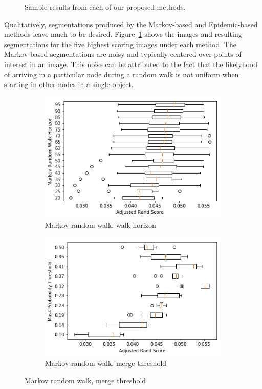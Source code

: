 \documentclass[twocolumn]{article}
\newcommand{\figref}[1]{Figure~\ref{fig:#1}}
\newcommand{\figlab}[1]{\label{fig:#1}}
\begin{document}
\begin{figure}[t!]
\caption{Sample results from each of our proposed methods.}
\figlab{sample_results}
\end{figure}

Qualitatively, segmentations produced by the Markov-based and Epidemic-based
methods leave much to be desired. \figref{sample_results} shows the images and
resulting segmentations for the five highest scoring images under each method.
The Markov-based segmentations are noisy and typically centered over points of
interest in an image. This noise can be attributed to the fact that the
likelyhood of arriving in a particular node during a random walk is not uniform
when starting in other nodes in a single object. 

\begin{figure}[t!]
  \centering

  \begin{subfigure}{0.49\linewidth}
    \includegraphics[width=\linewidth]{figs/markov_horizon.png}
    \caption{Markov random walk, walk horizon}
  \end{subfigure}
  \begin{subfigure}{0.49\linewidth}
    \includegraphics[width=\linewidth]{figs/markov_thresh.png}
    \caption{Markov random walk, merge threshold}
  \end{subfigure}


\end{figure}
\end{document}

